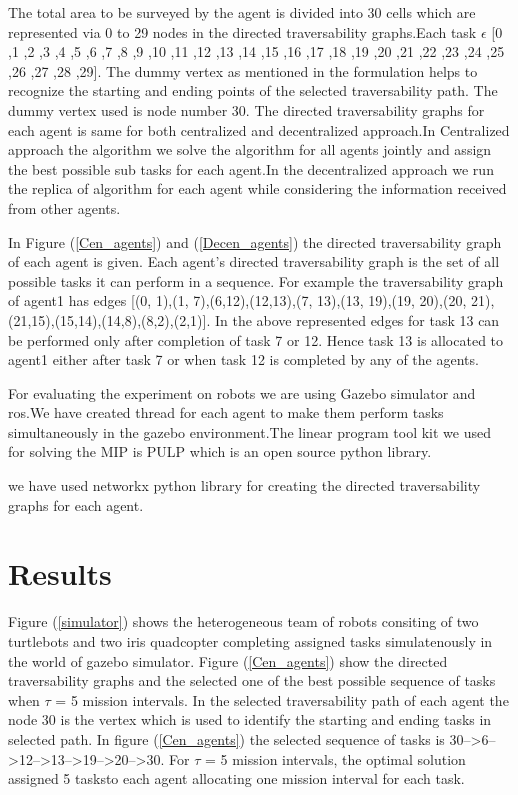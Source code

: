 \documentclass[conference]{IEEEtran}
\begin{document}
{The total area to be surveyed by the agent is divided into 30 cells which are represented via 0 to 29 nodes in the directed traversability graphs.Each task \( \epsilon \) [0 ,1 ,2 ,3 ,4 ,5 ,6 ,7 ,8 ,9 ,10 ,11 ,12 ,13 ,14 ,15 ,16 ,17 ,18 ,19 ,20 ,21 ,22 ,23 ,24 ,25 ,26 ,27 ,28 ,29].
The dummy vertex as mentioned in the formulation helps to recognize the starting and ending points of the selected traversability path. The dummy vertex used is node number 30.
The directed traversability graphs for each agent is same for both centralized and decentralized approach.In Centralized approach the algorithm we solve the algorithm for all agents jointly and assign the best possible sub tasks for each agent.In the decentralized approach we run the replica of algorithm for each agent while considering the information received from other agents.


In Figure (\ref{Cen_agents}) and (\ref{Decen_agents}) the directed traversability graph of each agent is given. Each agent's directed traversability graph is the set of all possible tasks it can perform in a sequence. For example the traversability graph of agent1 has edges [(0, 1),(1, 7),(6,12),(12,13),(7, 13),(13, 19),(19, 20),(20, 21),(21,15),(15,14),(14,8),(8,2),(2,1)]. In the above represented edges for task 13 can be performed only after completion of task 7 or 12. Hence task 13 is allocated to agent1 either after task 7 or when task 12 is completed by any of the agents.

For evaluating the experiment on robots we are using Gazebo simulator and ros.We have created thread for each agent to make  them perform tasks simultaneously in the gazebo environment.The linear program tool kit we used for solving the MIP is PULP which is an open source python library. 

we have used networkx python library for creating the directed traversability graphs for each agent.
\section{Results}

 Figure (\ref{simulator}) shows the heterogeneous team of robots consiting of two turtlebots and two iris quadcopter completing assigned tasks simulatenously in the world of gazebo simulator.
Figure (\ref{Cen_agents}) show the directed traversability graphs and the selected one of the best possible sequence of tasks when \(\tau\) = 5 mission intervals. In the selected traversability path of each agent the node 30 is the vertex which is used to identify the starting and ending tasks in selected path. In figure (\ref{Cen_agents}) the selected sequence of tasks is 30-->6-->12-->13-->19-->20-->30. For \(\tau\) = 5 mission intervals, the optimal solution assigned 5 tasksto each agent allocating one mission interval for each task.

}
\end{document}
